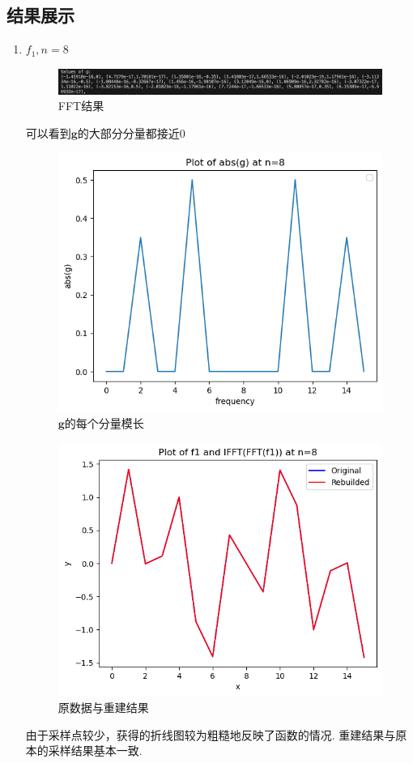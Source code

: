 \documentclass[UTF8]{ctexart}
\begin{document}
\subsection{结果展示}
\begin{enumerate}
  \item $f_1, n=8$
\begin{figure}[H]
    \centering
    \includegraphics[scale=0.5]{g_1.png}
    \caption{FFT结果}
\end{figure}
可以看到$\mathbf{g}$的大部分分量都接近0
\begin{figure}[H]
  \centering
  \includegraphics[scale=0.5]{g_abs_1.png}
  \caption{$\mathbf{g}$的每个分量模长}
\end{figure}
\begin{figure}[H]
  \centering
  \includegraphics[scale=0.5]{res_1.png}
  \caption{原数据与重建结果}
\end{figure}
由于采样点较少，获得的折线图较为粗糙地反映了函数的情况. 重建结果与原本的采样结果基本一致.


\end{enumerate}
\end{document}
